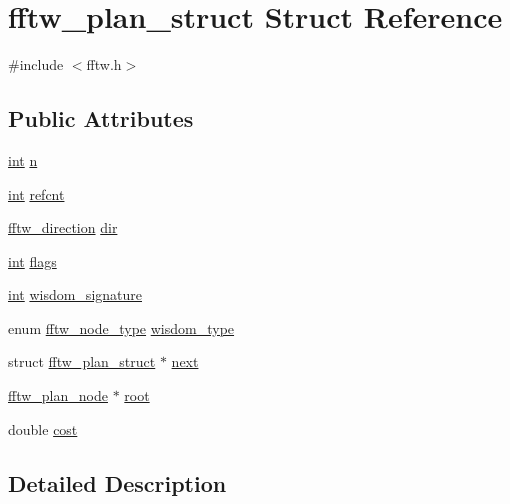 \hypertarget{structfftw__plan__struct}{}\section{fftw\+\_\+plan\+\_\+struct Struct Reference}
\label{structfftw__plan__struct}


{\ttfamily \#include $<$fftw.\+h$>$}

\subsection*{Public Attributes}
\begin{DoxyCompactItemize}
\item 
\hyperlink{xmltok_8h_a5a0d4a5641ce434f1d23533f2b2e6653}{int} \hyperlink{structfftw__plan__struct_a13ec77a105b6c2e62add092d1d2de42c}{n}
\item 
\hyperlink{xmltok_8h_a5a0d4a5641ce434f1d23533f2b2e6653}{int} \hyperlink{structfftw__plan__struct_a0f0cfe0f1312f8e5cfe2d4119070e547}{refcnt}
\item 
\hyperlink{fftw_8h_addfba51b1dc43e3660873b1ba9668cec}{fftw\+\_\+direction} \hyperlink{structfftw__plan__struct_ad01c0441a28c1e72360a6b42f6d63689}{dir}
\item 
\hyperlink{xmltok_8h_a5a0d4a5641ce434f1d23533f2b2e6653}{int} \hyperlink{structfftw__plan__struct_a437b5a527bdd148ae864289d5d173811}{flags}
\item 
\hyperlink{xmltok_8h_a5a0d4a5641ce434f1d23533f2b2e6653}{int} \hyperlink{structfftw__plan__struct_ac742b7d89ff272d35384c0fd4d82e332}{wisdom\+\_\+signature}
\item 
enum \hyperlink{fftw_8h_a62ecac3f39269a2efca878ca819349f1}{fftw\+\_\+node\+\_\+type} \hyperlink{structfftw__plan__struct_ab5226ce275144b46887c740ab90b79dd}{wisdom\+\_\+type}
\item 
struct \hyperlink{structfftw__plan__struct}{fftw\+\_\+plan\+\_\+struct} $\ast$ \hyperlink{structfftw__plan__struct_a626c58bf93a8b08eba8826ecc0c48781}{next}
\item 
\hyperlink{fftw_8h_a5a57076cc01d385442d34098af60d05c}{fftw\+\_\+plan\+\_\+node} $\ast$ \hyperlink{structfftw__plan__struct_a3dd4d10e8be63c41d51cf5f021501bd0}{root}
\item 
double \hyperlink{structfftw__plan__struct_af99ad45f9bb1e7847dad9df5e4265ba8}{cost}
\end{DoxyCompactItemize}


\subsection{Detailed Description}


